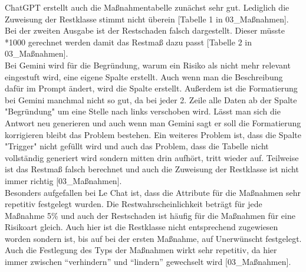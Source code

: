 ChatGPT erstellt auch die Maßnahmentabelle zunächst sehr gut. Lediglich die Zuweisung der Restklasse stimmt nicht überein 
[Tabelle 1 in 03\_Maßnahmen]. Bei der zweiten Ausgabe ist der Restschaden falsch dargestellt. Dieser müsste *1000 gerechnet 
werden damit das Restmaß dazu passt [Tabelle 2 in 03\_Maßnahmen].\\

Bei Gemini wird für die Begründung, warum ein Risiko als nicht mehr relevant eingestuft wird, eine eigene Spalte erstellt.
Auch wenn man die Beschreibung dafür im Prompt ändert, wird die Spalte erstellt. Außerdem ist die Formatierung bei Gemini
manchmal nicht so gut, da bei jeder 2. Zeile alle Daten ab der Spalte "Begründung" um eine Stelle nach links verschoben wird.
Lässt man sich die Antwort neu generieren und auch wenn man Gemini sagt er soll die Formatierung korrigieren bleibt das 
Problem bestehen. Ein weiteres Problem ist, dass die Spalte "Trigger" nicht gefüllt wird und auch das Problem, dass
die Tabelle nicht vollständig generiert wird sondern mitten drin aufhört, tritt wieder auf. Teilweise ist das Restmaß 
falsch berechnet und auch die Zuweisung der Restklasse ist nicht immer richtig [03\_Maßnahmen].\\

Besonders aufgefallen bei Le Chat ist, dass die Attribute für die Maßnahmen sehr repetitiv festgelegt wurden. Die Restwahrscheinlichkeit
beträgt für jede Maßnahme 5\% und auch der Restschaden ist häufig für die Maßnahmen für eine Risikoart gleich. Auch hier ist die 
Restklasse nicht entsprechend zugewiesen worden sondern ist, bis auf bei der ersten Maßnahme, auf Unerwünscht festgelegt. Auch 
die Festlegung des Typs der Maßnahmen wirkt sehr repetitiv, da hier immer zwischen ``verhindern'' und ``lindern'' gewechselt wird [03\_Maßnahmen].\\

